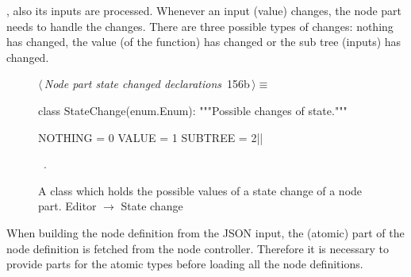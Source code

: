 \documentclass[%
    a4paper,    %
    justified,  %
    nobib,      %
    openany     %
]{tufte-book}
\makeatletter
\renewcommand{\label}[1]{\@tufte@label{##1}}%
\makeatother
\begin{document}
, also its inputs are
processed. Whenever an input (value) changes, the node part needs to handle the
changes. There are three possible types of changes: nothing has changed, the
value (of the function) has changed or the sub tree (inputs) has changed.

\begin{figure}[!htbp]
\begin{flushleft} \small
\begin{minipage}{\linewidth}\label{scrap117}\raggedright\small
{} $\langle\,${\itshape Node part state changed declarations}\nobreak\ {\footnotesize {156b}}$\,\rangle\equiv$
\vspace{-1ex}
\begin{pythoncode}
class StateChange(enum.Enum):
    """Possible changes of state."""

    NOTHING  = 0
    VALUE    = 1
    SUBTREE  = 2|\NWsep|
\end{pythoncode}
\vspace{1.5ex}
\footnotesize
\begin{list}{}{\setlength{\itemsep}{-\parsep}\setlength{\itemindent}{-\leftmargin}}
\item \NWtxtMacroRefIn\ .

\item{}
\end{list}
\end{minipage}\vspace{4ex}
\end{flushleft}
\caption{A class which holds the possible values of a state change of a node
  part.
  \newline{}\newline{}Editor $\rightarrow$ State change}
\end{figure}

 When building
the node definition from the JSON input, the (atomic) part of the node
definition is fetched from the node controller. Therefore it is necessary to
provide parts for the atomic types before loading all the node definitions.
\end{document}
